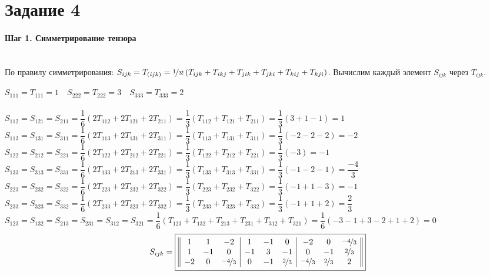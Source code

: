 \documentclass{article}
\newcommand*\squared[1]{\tikz[baseline=(char.base)]{
            \node[shape=rectangle,draw,inner sep=4pt] (char) {#1};}}
\begin{document}
\section*{Задание 4}
\paragraph*{Шаг 1. Симметрирование тензора} \, \\
По правилу симметрирования: $S_{ijk} = T_{(ijk)} =  \nicefrac{1}{3!}\left(T_{ijk} + T_{ikj} + T_{jik} + T_{jki} + T_{kij} + T_{kji}\right)$. Вычислим каждый элемент $S_{ijk}$ через $T_{ijk}$.
\begin{center}
$S_{111} = T_{111} = 1 \quad S_{222} = T_{222} = 3 \quad S_{333} = T_{333} = 2$ \\ \, \\
$S_{112} = S_{121} = S_{211} = \dfrac{1}{6}\left(2T_{112} + 2T_{121} + 2T_{211}\right) = \dfrac{1}{3}\left(T_{112} + T_{121} + T_{211}\right) = \dfrac{1}{3}(3 + 1 -1) = 1$ \\
$S_{113} = S_{131} = S_{311} = \dfrac{1}{6}\left(2T_{113} + 2T_{131} + 2T_{311}\right) = \dfrac{1}{3}\left(T_{113} + T_{131} + T_{311}\right) = \dfrac{1}{3}(-2 -2 -2) = -2$ \\
$S_{122} = S_{212} = S_{221} = \dfrac{1}{6}\left(2T_{122} + 2T_{212} + 2T_{221}\right) = \dfrac{1}{3}\left(T_{122} + T_{212} + T_{221}\right) = \dfrac{1}{3}(-3) = -1$ \\
$S_{133} = S_{313} = S_{331} = \dfrac{1}{6}\left(2T_{133} + 2T_{313} + 2T_{331}\right) = \dfrac{1}{3}\left(T_{133} + T_{313} + T_{331}\right) = \dfrac{1}{3}(-1-2-1) = \dfrac{-4}{3}$ \\
$S_{223} = S_{232} = S_{322} = \dfrac{1}{6}\left(2T_{223} + 2T_{232} + 2T_{322}\right) = \dfrac{1}{3}\left(T_{223} + T_{232} + T_{322}\right) = \dfrac{1}{3}(-1+1-3) = -1$ \\
$S_{233} = S_{323} = S_{332} = \dfrac{1}{6}\left(2T_{233} + 2T_{323} + 2T_{332}\right) = \dfrac{1}{3}\left(T_{233} + T_{323} + T_{332}\right) = \dfrac{1}{3}(-1+1+2) = \dfrac{2}{3}$ \\
$S_{123} = S_{132} = S_{213} = S_{231} = S_{312} = S_{321} = \dfrac{1}{6}(T_{123} + T_{132} + T_{213} + T_{231} + T_{312} + T_{321}) = \dfrac{1}{6}(-3 -1 + 3 -2 + 1 + 2) = 0$\\
$$S_{ijk} = \squared{$\begin{array}{||ccc|ccc|ccc||}
1 & 1 & -2 & 1 & -1 & 0 & -2 & 0 & \nicefrac{-4}{3} \\
1 & -1 & 0 & -1 & 3 & -1 & 0 & -1 & \nicefrac{2}{3} \\
-2 & 0 & \nicefrac{-4}{3} & 0 & -1 & \nicefrac{2}{3} & \nicefrac{-4}{3} & \nicefrac{2}{3} & 2 \\
\end{array}$}$$
\end{center}
\end{document}
